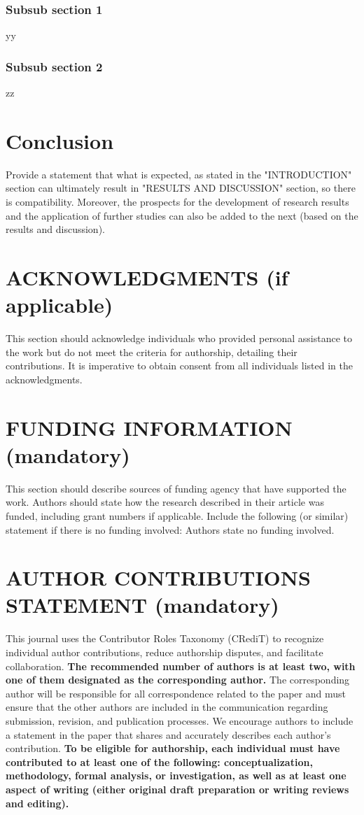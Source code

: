 \documentclass{iaesarticle}
\begin{document}
\subsubsection {Subsub section 1}
yy

\subsubsection {Subsub section 2}
zz

\section{Conclusion}
\label{}
Provide a statement that what is expected, as stated in the "INTRODUCTION" section can ultimately result in "RESULTS AND DISCUSSION" section, so there is compatibility. Moreover, the prospects for the development of research results and the application of further studies can also be added to the next (based on the results and discussion).

\section*{ACKNOWLEDGMENTS (if applicable)}
\label{}
This section should acknowledge individuals who provided personal assistance to the work but do not meet the criteria for authorship, detailing their contributions. It is imperative to obtain consent from all individuals listed in the acknowledgments.

\section*{FUNDING INFORMATION (mandatory)}
\label{}
This section should describe sources of funding agency that have supported the work. Authors should state how the research described in their article was funded, including grant numbers if applicable. Include the following (or similar) statement if there is no funding involved: Authors state no funding involved.

\section*{AUTHOR CONTRIBUTIONS STATEMENT (mandatory)}
\label{}
This journal uses the Contributor Roles Taxonomy (CRediT) to recognize individual author contributions, reduce authorship disputes, and facilitate collaboration. \textbf{The recommended number of authors is at least two, with one of them designated as the corresponding author.} The corresponding author will be responsible for all correspondence related to the paper and must ensure that the other authors are included in the communication regarding submission, revision, and publication processes. We encourage authors to include a statement in the paper that shares and accurately describes each author's contribution. \textbf{To be eligible for authorship, each individual must have contributed to at least one of the following: conceptualization, methodology, formal analysis, or investigation, as well as at least one aspect of writing (either original draft preparation or writing reviews and editing).}
\end{document}
